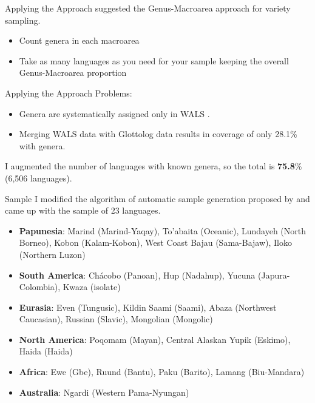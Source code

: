 \documentclass[12pt,aspectratio=169,t]{beamer}
\renewcommand{\'}{\textquotesingle}
\begin{document}
\begin{frame}{Applying the Approach}
	\cite{miestamo2016sampling} suggested the Genus-Macroarea approach for variety sampling.
	\begin{itemize}
		\item Count genera in each macroarea
		\item Take as many languages as you need for your sample keeping the overall Genus-Macroarea proportion
	\end{itemize}
	
\end{frame}	
\begin{frame}{Applying the Approach}	
	Problems:
	\begin{itemize}
		\item Genera are systematically assigned only in WALS \citep{wals}.
		\item Merging WALS data with Glottolog data results in coverage of only 28.1\% with genera.
	\end{itemize}
	
	I augmented the number of languages with known genera, so the total is \textbf{75.8}\% (6,506 languages).

\end{frame}


\begin{frame}{Sample}
	I modified the algorithm of automatic sample generation proposed by \cite{cheveleva2023} and came up with the sample of 23 languages.
	
	\vspace{-0.5em}
	\footnotesize
	\begin{itemize}
		\item \textbf{Papunesia}: Marind (Marind-Yaqay), To'abaita (Oceanic), Lundayeh (North Borneo), Kobon (Kalam-Kobon), West Coast Bajau (Sama-Bajaw), Iloko (Northern Luzon)
		\item \textbf{South America}: Chácobo (Panoan), Hup (Nadahup), Yucuna (Japura-Colombia), Kwaza (isolate)
		\item \textbf{Eurasia}: Even (Tungusic), Kildin Saami (Saami), Abaza (Northwest Caucasian), Russian (Slavic), Mongolian (Mongolic)
		\item \textbf{North America}: Poqomam (Mayan), Central Alaskan Yupik (Eskimo), Haida (Haida)
		\item \textbf{Africa}: Ewe (Gbe), Ruund (Bantu), Paku (Barito), Lamang (Biu-Mandara)
		\item \textbf{Australia}: Ngardi (Western Pama-Nyungan)
	\end{itemize}
\end{frame}
\end{document}
